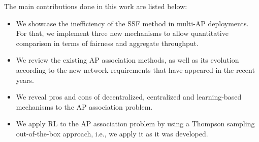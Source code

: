\documentclass{article}
\begin{document}
		The main contributions done in this work are listed below:
		\begin{itemize}
			\item We showcase the inefficiency of the SSF method in multi-AP deployments. For that, we implement three new mechanisms to allow quantitative comparison in terms of fairness and aggregate throughput.
			\item We review the existing AP association methods, as well as its evolution according to the new network requirements that have appeared in the recent years.
			\item We reveal pros and cons of decentralized, centralized and learning-based mechanisms to the AP association problem.
			\item We apply RL to the AP association problem by using a Thompson sampling out-of-the-box approach, i.e., we apply it as it was developed.
		\end{itemize}		
		
%		
%		
		
\end{document}
